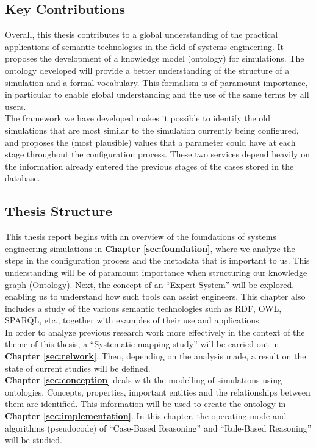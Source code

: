\subsection{Key Contributions}
Overall, this thesis contributes to a global understanding of the practical applications of semantic technologies in the field of systems engineering. It proposes the development of a knowledge model (ontology) for simulations. The ontology developed will provide a better understanding of the structure of a simulation and a formal vocabulary. This formalism is of paramount importance, in particular to enable global understanding and the use of the same terms by all users.\\

The framework we have developed makes it possible to identify the old simulations that are most similar to the simulation currently being configured, and proposes the (most plausible) values that a parameter could have at each stage throughout the configuration process. These two services depend heavily on the information already entered the previous stages of the cases stored in the database.


\subsection{Thesis Structure}
This thesis report begins with an overview of the foundations of systems engineering simulations in \textbf{Chapter \ref{sec:foundation}}, where we analyze the steps in the configuration process and the metadata that is important to us. This understanding will be of paramount importance when structuring our knowledge graph (Ontology). Next, the concept of an “Expert System” will be explored, enabling us to understand how such tools can assist engineers. This chapter also includes a study of the various semantic technologies such as RDF, OWL, SPARQL, etc., together with examples of their use and applications. \\

In order to analyze previous research work more effectively in the context of the theme of this thesis, a “Systematic mapping study” will be carried out in \textbf{Chapter \ref{sec:relwork}}. Then, depending on the analysis made, a result on the state of current studies will be defined.\\

\textbf{Chapter \ref{sec:conception}} deals with the modelling of simulations using ontologies. Concepts, properties, important entities and the relationships between them are identified. This information will be used to create the ontology in \textbf{Chapter \ref{sec:implementation}}. In this chapter, the operating mode and algorithms (pseudocode) of “Case-Based Reasoning” and “Rule-Based Reasoning” will be studied. \\

